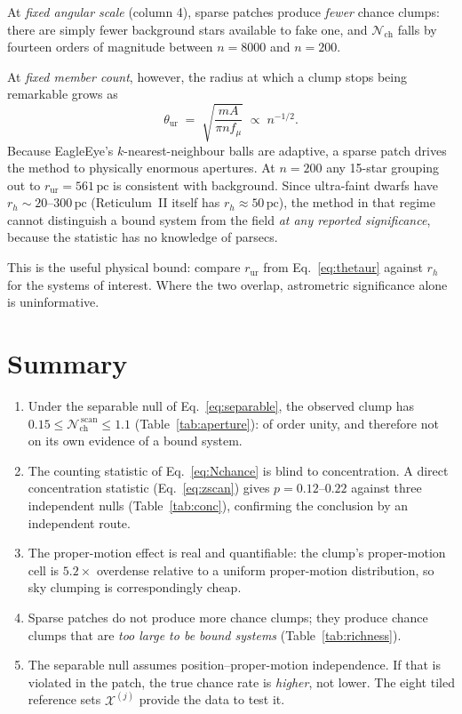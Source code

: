 \documentclass[11pt,a4paper]{article}
\newcommand{\unit}[1]{\ensuremath{\,\mathrm{#1}}}
\newcommand{\Nchance}{\mathcal{N}_{\mathrm{ch}}}
\newcommand{\Xset}{\mathcal{X}}
\begin{document}
At \emph{fixed angular scale} (column 4), sparse patches produce \emph{fewer}
chance clumps: there are simply fewer background stars available to fake one, and
$\Nchance$ falls by fourteen orders of magnitude between $n=8000$ and $n=200$.

At \emph{fixed member count}, however, the radius at which a clump stops being
remarkable grows as
%
\begin{equation}
\theta_{\mathrm{ur}} \;=\; \sqrt{\frac{m A}{\pi n f_\mu}} \;\propto\; n^{-1/2} .
\label{eq:thetaur}
\end{equation}
%
Because EagleEye's $k$-nearest-neighbour balls are adaptive, a sparse patch drives
the method to physically enormous apertures. At $n=200$ any 15-star grouping out
to $r_{\mathrm{ur}}=561\unit{pc}$ is consistent with background. Since ultra-faint
dwarfs have $r_h \sim 20\text{--}300\unit{pc}$ (Reticulum~II itself has
$r_h\approx50\unit{pc}$), the method in that regime cannot distinguish a bound
system from the field \emph{at any reported significance}, because the statistic
has no knowledge of parsecs.

\medskip
\noindent
This is the useful physical bound: compare $r_{\mathrm{ur}}$ from
Eq.~\eqref{eq:thetaur} against $r_h$ for the systems of interest. Where the two
overlap, astrometric significance alone is uninformative.

\section{Summary}

\begin{enumerate}\itemsep2pt
\item Under the separable null of Eq.~\eqref{eq:separable}, the observed clump has
      $0.15 \le \Nchance^{\,\mathrm{scan}} \le 1.1$ (Table~\ref{tab:aperture}):
      of order unity, and therefore not on its own evidence of a bound system.
\item The counting statistic of Eq.~\eqref{eq:Nchance} is blind to concentration.
      A direct concentration statistic (Eq.~\ref{eq:zscan}) gives
      $p=0.12$--$0.22$ against three independent nulls (Table~\ref{tab:conc}),
      confirming the conclusion by an independent route.
\item The proper-motion effect is real and quantifiable: the clump's proper-motion
      cell is $5.2\times$ overdense relative to a uniform proper-motion
      distribution, so sky clumping is correspondingly cheap.
\item Sparse patches do not produce more chance clumps; they produce chance clumps
      that are \emph{too large to be bound systems} (Table~\ref{tab:richness}).
\item The separable null assumes position--proper-motion independence. If that is
      violated in the patch, the true chance rate is \emph{higher}, not lower.
      The eight tiled reference sets $\Xset^{(j)}$ provide the data to test it.
\end{enumerate}
\end{document}
